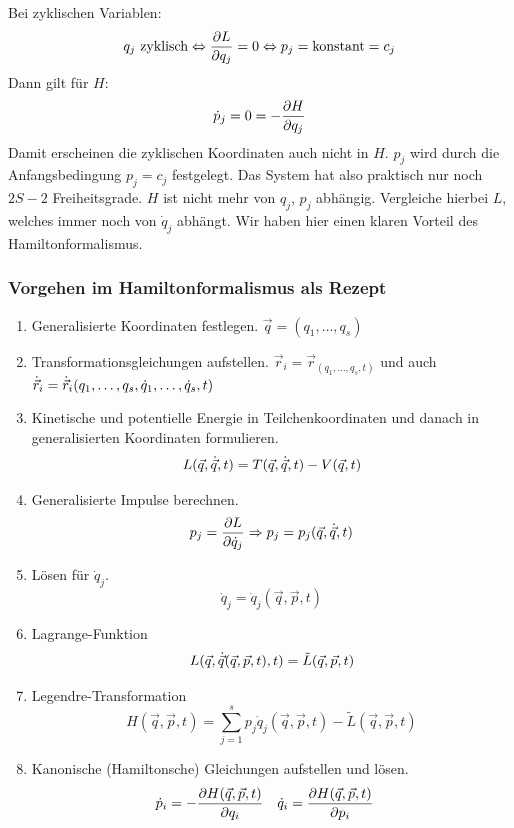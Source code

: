 Bei zyklischen Variablen:
$$q_j \text{~zyklisch} \Leftrightarrow \frac{\partial L}{\partial q_j} = 0 \Leftrightarrow p_j = \text{konstant} = c_j$$
Dann gilt für $H$:
$$\dot{p}_j = 0 = -\frac{\partial H}{\partial q_j}$$
Damit erscheinen die zyklischen Koordinaten auch nicht in $H$.
$p_j$ wird durch die Anfangsbedingung $p_j = c_j$ festgelegt. Das System hat also praktisch nur noch $2S - 2$ Freiheitsgrade.
$H$ ist nicht mehr von $q_j$, $p_j$ abhängig. Vergleiche hierbei $L$, welches immer noch von $\dot{q}_j$ abhängt. Wir haben hier einen klaren Vorteil des Hamiltonformalismus.

\subsubsection{Vorgehen im Hamiltonformalismus als Rezept}
\begin{enumerate}
	\item Generalisierte Koordinaten festlegen. $\vec{q} = (q_1, \dots, q_s)$
	\item Transformationsgleichungen aufstellen. $\vec{r}_i = \vec{r}_(q_1, \dots, q_s, t)$ und auch $\dot{\vec{r}}_i = \dot{\vec{r}}_i(q_1, \dots, q_s, \dot{q}_1, \dots, \dot{q}_s, t)$
	\item Kinetische und potentielle Energie in Teilchenkoordinaten und danach in generalisierten Koordinaten formulieren.
	$$L(\vec{q}, \dot{\vec{q}}, t) = T(\vec{q}, \dot{\vec{q}},t)  - V(\vec{q}, t)$$
	\item Generalisierte Impulse berechnen.
		$$p_j = \frac{\partial L}{\partial \dot{q}_j} \Rightarrow p_j = p_j(\vec{q}, \dot{\vec{q}}, t)$$
	\item Lösen für $\dot{q}_j$.
	$$\dot{q}_j = \dot{q}_j (\vec{q}, \vec{p}, t)$$
	\item Lagrange-Funktion
	$$L(\vec{q}, \dot{\vec{q}}(\vec{q}, \vec{p}, t), t) = \tilde{L}(\vec{q}, \vec{p}, t)$$
	\item Legendre-Transformation
	$$H(\vec{q}, \vec{p}, t) = \sum_{j=1}^s p_j \dot{q}_j(\vec{q}, \vec{p}, t) - \tilde{L}(\vec{q}, \vec{p}, t)$$
	\item Kanonische (Hamiltonsche) Gleichungen aufstellen und lösen.
	\begin{align*}
	\dot{p}_i &= -\frac{\partial H(\vec{q},\vec{p},t)}{\partial q_i} & \dot{q}_i &= \frac{\partial H(\vec{q},\vec{p},t)}{\partial p_i}
	\end{align*}
\end{enumerate}

